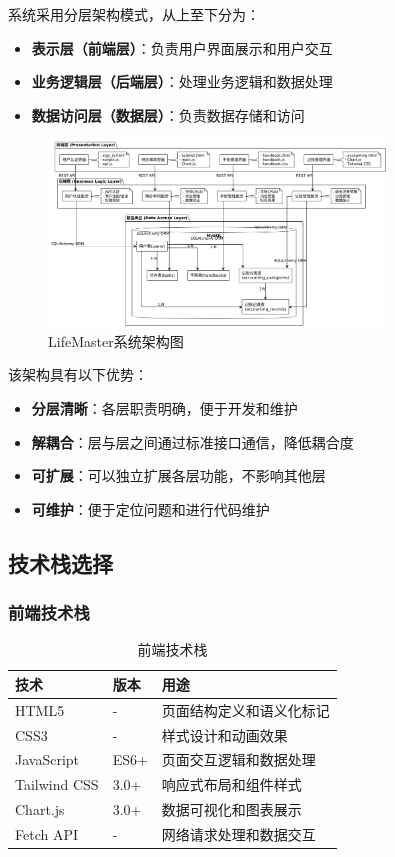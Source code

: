 \documentclass[a4paper]{article}
\begin{document}
系统采用分层架构模式，从上至下分为：

\begin{itemize}
    \item \textbf{表示层（前端层）}：负责用户界面展示和用户交互
    \item \textbf{业务逻辑层（后端层）}：处理业务逻辑和数据处理
    \item \textbf{数据访问层（数据层）}：负责数据存储和访问
\end{itemize}

\begin{figure}[H]
\centering
\includegraphics[width=0.8\textwidth]{img/architecture.png}
\caption{LifeMaster系统架构图}
\end{figure}

该架构具有以下优势：

\begin{itemize}
    \item \textbf{分层清晰}：各层职责明确，便于开发和维护
    \item \textbf{解耦合}：层与层之间通过标准接口通信，降低耦合度
    \item \textbf{可扩展}：可以独立扩展各层功能，不影响其他层
    \item \textbf{可维护}：便于定位问题和进行代码维护
\end{itemize}

\subsection{技术栈选择}

\subsubsection{前端技术栈}

\begin{table}[H]
\centering
\begin{tabular}{|l|l|p{6cm}|}
\hline
\textbf{技术} & \textbf{版本} & \textbf{用途} \\
\hline
HTML5 & - & 页面结构定义和语义化标记 \\
\hline
CSS3 & - & 样式设计和动画效果 \\
\hline
JavaScript & ES6+ & 页面交互逻辑和数据处理 \\
\hline
Tailwind CSS & 3.0+ & 响应式布局和组件样式 \\
\hline
Chart.js & 3.0+ & 数据可视化和图表展示 \\
\hline
Fetch API & - & 网络请求处理和数据交互 \\
\hline
\end{tabular}
\caption{前端技术栈}
\end{table}
\end{document}
